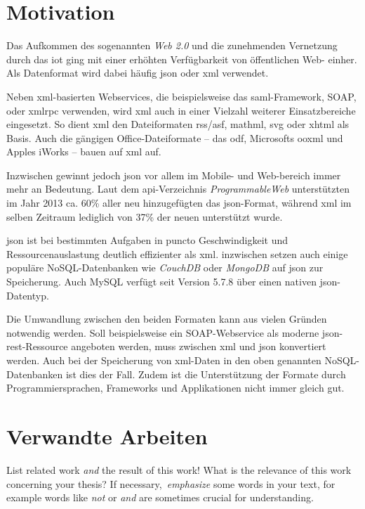 \section{Motivation}
\label{sec:motivation}
Das Aufkommen des sogenannten \emph{Web 2.0} und die zunehmenden Vernetzung
durch das \gls{iot} ging mit einer erhöhten
Verfügbarkeit von öffentlichen Web- einher. Als Datenformat wird dabei
häufig \acrshort{json} oder \acrshort{xml} verwendet.

Neben \acrshort{xml}-basierten Webservices, die beispielsweise das \acrshort{saml}-Framework, SOAP,
oder \gls{xmlrpc} verwenden, wird \acrshort{xml} auch in einer Vielzahl weiterer
Einsatzbereiche eingesetzt. So dient \acrshort{xml} den Dateiformaten \acrshort{rss}/\acrshort{asf}, \acrshort{mathml},
\gls{svg} oder \gls{xhtml} als Basis. Auch die gängigen
Office-Dateiformate -- das \acrfull{odf}, Microsofts %
\acrfull{ooxml} und Apples iWorks -- bauen auf \acrshort{xml} auf. %

Inzwischen gewinnt jedoch \acrshort{json} vor allem im Mobile-
und Web-bereich immer mehr an Bedeutung. Laut dem \acrshort{api}-Verzeichnis
\emph{ProgrammableWeb} unterstützten im Jahr 2013 ca. 60\% aller neu
hinzugefügten  das \acrshort{json}-Format, während
\acrshort{xml} im selben Zeitraum lediglich von 37\% der neuen 
unterstützt wurde.\cite{duvander2013convergence}

\acrshort{json} ist bei bestimmten Aufgaben in puncto Geschwindigkeit und
Ressourcenauslastung deutlich effizienter\cite{nurseitov2009comparison} als
\acrshort{xml}\@. inzwischen setzen auch einige populäre NoSQL-Datenbanken wie
\emph{CouchDB} oder \emph{MongoDB} auf \acrshort{json} zur Speicherung. Auch
MySQL verfügt seit Version 5.7.8 über einen nativen \acrshort{json}-Datentyp.

Die Umwandlung zwischen den beiden Formaten kann aus vielen Gründen
notwendig werden. Soll beispielsweise ein SOAP-Webservice als moderne
\acrshort{json}-\acrshort{rest}-Ressource angeboten werden, muss zwischen \acrshort{xml} und \acrshort{json} konvertiert
werden. Auch bei der Speicherung von \acrshort{xml}-Daten in den oben genannten NoSQL-Datenbanken
ist dies der Fall. Zudem ist die Unterstützung der Formate durch
Programmiersprachen, Frameworks und Applikationen nicht immer gleich gut.

\section{Verwandte Arbeiten}
List related work \emph{and} the result of this work\@! What is the relevance of this work concerning your thesis\@? If necessary,\ \emph{emphasize} some words in your text, for example words like \emph{not} or \emph{and} are sometimes crucial for understanding\@.

